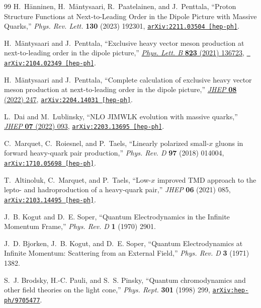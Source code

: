 \begin{thebibliography}{99}
H.~H\"anninen, H.~M\"antysaari, R.~Paatelainen, and J.~Penttala, ``{Proton Structure Functions at Next-to-Leading Order in the Dipole Picture with Massive Quarks},'' {\em Phys. Rev. Lett.} {\bf 130} (2023) 192301, \href{http://arxiv.org/abs/2211.03504}{{\tt arXiv:2211.03504 [hep-ph]}}.

H.~M\"antysaari and J.~Penttala, ``{Exclusive heavy vector meson production at
  next-to-leading order in the dipole picture},''
  \href{http://dx.doi.org/10.1016/j.physletb.2021.136723}{{\em Phys. Lett. B}
  {\bf 823} (2021)  136723}, \href{http://arxiv.org/abs/2104.02349}{{\tt
  arXiv:2104.02349 [hep-ph]}}.

H.~M\"antysaari and J.~Penttala, ``{Complete calculation of exclusive heavy
  vector meson production at next-to-leading order in the dipole picture},''
  \href{http://dx.doi.org/10.1007/JHEP08(2022)247}{{\em JHEP} {\bf 08} (2022)
  247}, \href{http://arxiv.org/abs/2204.14031}{{\tt arXiv:2204.14031
  [hep-ph]}}.

L.~Dai and M.~Lublinsky, ``{NLO JIMWLK evolution with massive quarks},''
  \href{http://dx.doi.org/10.1007/JHEP07(2022)093}{{\em JHEP} {\bf 07} (2022)
  093}, \href{http://arxiv.org/abs/2203.13695}{{\tt arXiv:2203.13695
  [hep-ph]}}.

C.~Marquet, C.~Roiesnel, and P.~Taels, ``{Linearly polarized small-$x$ gluons in forward heavy-quark pair production},'' {\em Phys. Rev. D} {\bf 97} (2018) 014004, \href{http://arxiv.org/abs/1710.05698}{{\tt arXiv:1710.05698 [hep-ph]}}.

T.~Altinoluk, C.~Marquet, and P.~Taels, ``{Low-$x$ improved TMD approach to the lepto- and hadroproduction of a heavy-quark pair},'' {\em JHEP} {\bf 06} (2021) 085, \href{http://arxiv.org/abs/2103.14495}{{\tt arXiv:2103.14495 [hep-ph]}}.

J.~B. Kogut and D.~E. Soper, ``{Quantum Electrodynamics in the Infinite Momentum Frame},'' {\em Phys. Rev. D} {\bf 1} (1970) 2901.

J.~D. Bjorken, J.~B. Kogut, and D.~E. Soper, ``{Quantum Electrodynamics at Infinite Momentum: Scattering from an External Field},'' {\em Phys. Rev. D} {\bf 3} (1971) 1382.

S.~J. Brodsky, H.-C. Pauli, and S.~S. Pinsky, ``{Quantum chromodynamics and other field theories on the light cone},'' {\em Phys. Rept.} {\bf 301} (1998) 299, \href{http://arxiv.org/abs/hep-ph/9705477}{{\tt arXiv:hep-ph/9705477}}.


\end{thebibliography}
